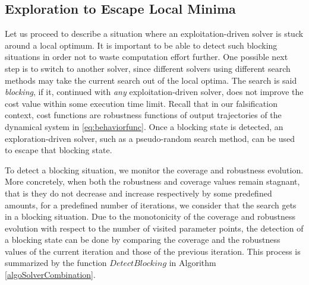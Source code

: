 
\subsection{Exploration to Escape Local Minima}
Let us proceed to describe a situation where an exploitation-driven solver is stuck around a local optimum. It is important to be able to detect such blocking situations in order not to waste computation effort further. One possible next step is to switch to another solver, since different solvers using different search methods may take the current search out of the local optima. The search is said {\em blocking}, if it, continued with {\em any} exploitation-driven solver, does not improve the cost value within some execution time limit. Recall that in our falsification context, cost functions are robustness functions of output trajectories of the dynamical system in \ref{eq:behaviorfunc}. Once a blocking state is detected, an exploration-driven solver, such as a pseudo-random search method, can be used to escape that blocking state. 

To detect a blocking situation, we monitor the coverage and robustness evolution. More concretely, when both the robustness and coverage values remain stagnant, that is they do not decrease and increase respectively by some predefined amounts, for a predefined number of iterations, we consider that the search gets in a blocking situation. Due to the monotonicity of the coverage and robustness evolution with respect to the number of visited parameter points, the detection of a blocking state can be done by comparing the coverage and the robustness values of the current iteration and those of the previous iteration. This process is summarized by the function $DetectBlocking$ in Algorithm \ref{algoSolverCombination}.

